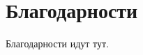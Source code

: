 \documentclass{mipt-thesis-bs}
\begin{document}
\backmatter


\chapter{Благодарности}

Благодарности идут тут.
\end{document}
